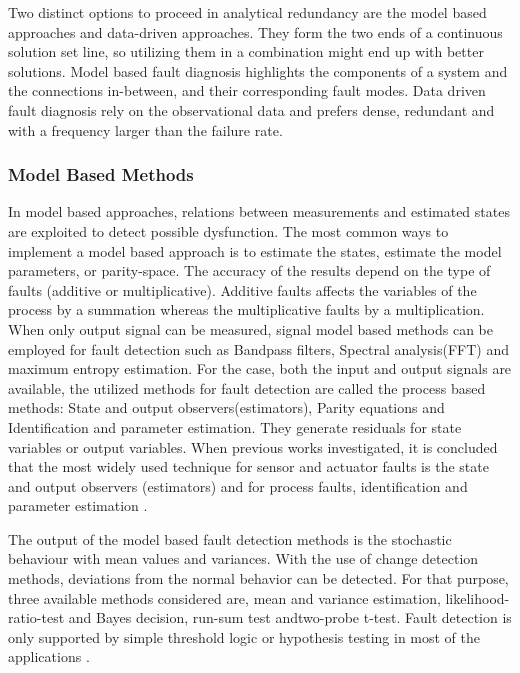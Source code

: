 Two distinct options to proceed in analytical redundancy are the model based 
approaches and data-driven approaches. They form the two ends of a continuous 
solution set line, so utilizing them in a combination might end up with better solutions. 
Model based fault diagnosis highlights the components of a system and the connections 
in-between, and their corresponding fault modes. Data driven fault diagnosis rely on 
the observational data and prefers dense, redundant and with a  frequency larger than 
the failure rate. 

%

\subsubsection{Model Based Methods}

In model based approaches, relations between measurements and estimated 
states are exploited to detect possible dysfunction. The most common ways to 
implement a model based approach is to estimate the states, estimate the model 
parameters, or parity-space. The accuracy of the results depend on the type of 
faults (additive or multiplicative). Additive faults affects the variables of the process 
by a summation whereas the multiplicative faults by a multiplication.  When only 
output signal can be measured, signal model based methods can be employed for 
fault detection such as Bandpass filters, Spectral analysis(FFT) and maximum entropy estimation. 
For the case, both the input and output signals are available, the utilized methods 
for fault detection are called the process based methods: State and output 
observers(estimators), Parity equations and Identification and parameter estimation. 
They generate residuals for state variables or output variables. When previous works 
investigated, it is concluded that the most widely used technique for sensor and actuator 
faults is the state and output observers (estimators) and for process faults, identification 
and parameter estimation \cite{isermann1997trends}.

The output of the model based fault detection methods is the stochastic behaviour 
with mean values and variances. With the use of change detection methods, deviations 
from the normal behavior can be detected. For that purpose, three available methods 
considered are, mean and variance estimation, likelihood-ratio-test and Bayes decision, 
run-sum test andtwo-probe t-test. Fault detection is only supported by simple threshold 
logic or hypothesis testing in most of the applications \cite{isermann1997trends}.

